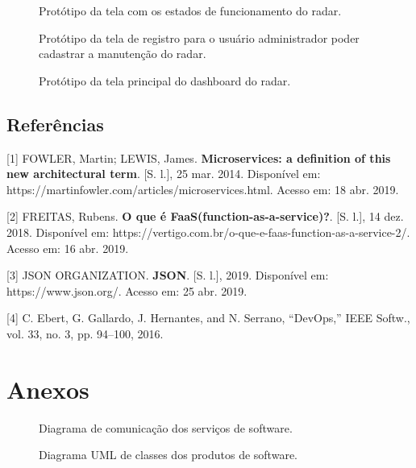 \begin{figure}[ht]
	\caption{\label{fig:tela_status} Protótipo da tela com os estados de funcionamento do radar.}
\end{figure}\newpage

\begin{figure}[ht]
	\caption{\label{fig:tela_registro} Protótipo da tela de registro para o usuário administrador poder cadastrar a manutenção do radar.}
\end{figure}\newpage

\begin{figure}[ht]
	\caption{\label{fig:tela_dashboard} Protótipo da tela principal do dashboard do radar.}
\end{figure}\newpage

\section{Referências}

[1] FOWLER, Martin; LEWIS, James.
\textbf{Microservices: a definition of this new architectural term}.
[S. l.], 25 mar. 2014. Disponível em: https://martinfowler.com/articles/microservices.html. Acesso em: 18 abr. 2019.

[2] FREITAS, Rubens.
\textbf{O que é FaaS(function-as-a-service)?}.
[S. l.], 14 dez. 2018. Disponível em: https://vertigo.com.br/o-que-e-faas-function-as-a-service-2/. Acesso em: 16 abr. 2019.

[3] JSON ORGANIZATION.
\textbf{JSON}. [S. l.], 2019. Disponível em: https://www.json.org/. Acesso em: 25 abr. 2019.

[4] C. Ebert, G. Gallardo, J. Hernantes, and N. Serrano, “DevOps,” IEEE Softw., vol. 33, no. 3, pp. 94–100, 2016.
\chapter{Anexos}

\begin{figure}[ht]
	\caption{\label{fig:diagrama-comm-soft} Diagrama de comunicação dos serviços de software.}
\end{figure}

\begin{figure}[ht]
	\caption{\label{fig:diagrama-classe-soft} Diagrama UML de classes dos produtos de software.}
\end{figure}